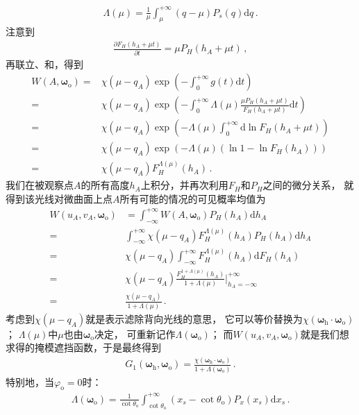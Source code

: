 \begin{align}
    \Lambda(\mu)=\frac{1}{\mu}\int_{\mu}^{+\infty}(q-\mu)P_s(q)\mathrm{d}q\, .
\end{align}
注意到
\begin{align}
    \frac{\partial F_H(h_A+\mu t)}{\partial t}=\mu P_H(h_A+\mu t)\, ,
\end{align}
再联立、和，得到
\begin{align}
    W(A,{\bm\omega}_{\mathrm{o}})=&\chi(\mu-q_A)\exp\left(-\int_{0}^{+\infty}g(t)\mathrm{d}t\right)\nonumber\\
    =&\chi(\mu-q_A)\exp\left(-\int_{0}^{+\infty}\Lambda(\mu)\frac{\mu P_H(h_A+\mu t)}{F_H(h_A+\mu t)}\mathrm{d}t\right)\nonumber\\
    =&\chi(\mu-q_A)\exp\left(-\Lambda(\mu)\int_{0}^{+\infty}\mathrm{d}\ln F_H(h_A+\mu t)\right)\nonumber\\
    =&\chi(\mu-q_A)\exp\left(-\Lambda(\mu)(\ln 1 - \ln F_H(h_A))\right)\nonumber\\
    =&\chi(\mu-q_A)F_H^{\Lambda(\mu)}(h_A)\, .
\end{align}
我们在被观察点$A$的所有高度$h_A$上积分，并再次利用$F_H$和$P_H$之间的微分关系，
就得到该光线对微曲面上点$A$所有可能的情况的可见概率均值为
\begin{align}\label{eq:08ex01-AverageVisibleProbability}
    W(u_A,v_A,{\bm\omega}_{\mathrm{o}})&=\int_{-\infty}^{+\infty}W(A,{\bm\omega}_{\mathrm{o}})P_H(h_A)\mathrm{d}h_A\nonumber\\
    =&\int_{-\infty}^{+\infty}\chi(\mu-q_A)F_H^{\Lambda(\mu)}(h_A)P_H(h_A)\mathrm{d}h_A\nonumber\\
    =&\chi(\mu-q_A)\int_{-\infty}^{+\infty}F_H^{\Lambda(\mu)}(h_A)\mathrm{d}F_H(h_A)\nonumber\\
    =&\chi(\mu-q_A)\frac{F_H^{1+\Lambda(\mu)}(h_A)}{1+\Lambda(\mu)}\bigg|_{h_A=-\infty}^{+\infty}\nonumber\\
    =&\frac{\chi(\mu-q_A)}{1+\Lambda(\mu)}\, .
\end{align}
考虑到$\chi(\mu-q_A)$就是表示滤除背向光线的意思，
它可以等价替换为$\chi({\bm\omega}_{\mathrm{h}}\cdot{\bm\omega}_{\mathrm{o}})$；
$\Lambda(\mu)$中$\mu$也由${\bm\omega}_{\mathrm{o}}$决定，
可重新记作$\Lambda({\bm\omega}_{\mathrm{o}})$；
而$W(u_A,v_A,{\bm\omega}_{\mathrm{o}})$就是我们想求得的掩模遮挡函数，于是最终得到
\begin{align}\label{eq:08-ex01-Smith-masking-function}
    G_1({\bm\omega}_{\mathrm{h}},{\bm\omega}_{\mathrm{o}})
    =\frac{\chi({\bm\omega}_{\mathrm{h}}\cdot{\bm\omega}_{\mathrm{o}})}
    {1+\Lambda({\bm\omega}_{\mathrm{o}})}\, .
\end{align}
特别地，当$\varphi_{\mathrm{o}}=0$时：
\begin{align}\label{eq:08-ex01-Lambda-function}
    \Lambda({\bm\omega}_{\mathrm{o}})=\frac{1}{\cot\theta_{\mathrm{o}}}
    \int_{\cot\theta_{\mathrm{o}}}^{+\infty}(x_s-\cot\theta_{\mathrm{o}})P_x(x_s)\mathrm{d}x_s\, .
\end{align}

